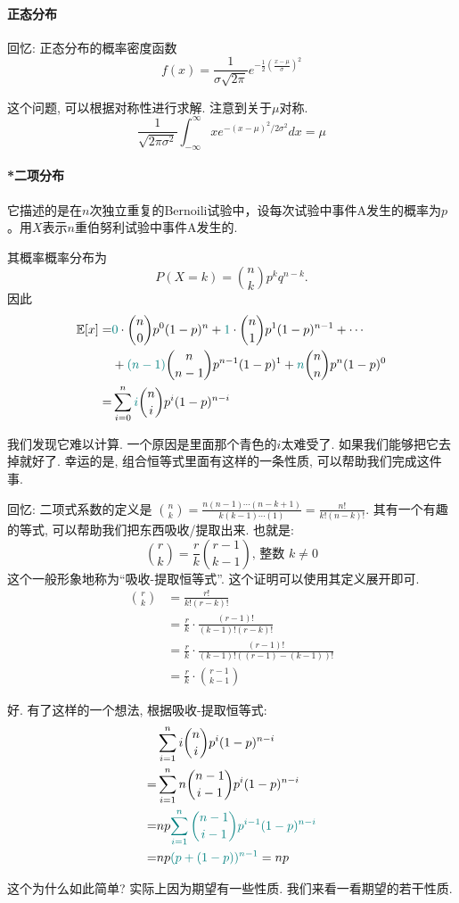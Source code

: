 \paragraph{正态分布}
回忆: 正态分布的概率密度函数$$
    f(x)=\frac{1}{\sigma \sqrt{2 \pi}} e^{-\frac{1}{2}\left(\frac{x-\mu}{\sigma}\right)^2}
    $$

    这个问题, 可以根据对称性进行求解. 注意到关于$\mu$对称.  
    $$
\frac{1}{\sqrt{2 \pi \sigma^2}} \int_{-\infty}^{\infty} x e^{-(x-\mu)^2 / 2 \sigma^2} d x=\mu
$$


    \begin{shaded}
        \paragraph{*二项分布} 它描述的是在$n$次独立重复的Bernoili试验中，设每次试验中事件A发生的概率为$p$。用$X$表示$n$重伯努利试验中事件A发生的{}.

        其概率概率分布为$$P(X=k)={n\choose k} p^k q^{n-k}.$$
        因此
    $$
\begin{aligned}
\mathbb E[x]= & {{\color{teal}0}} \cdot {n \choose 0} p^0(1-p)^n+{{\color{teal}1}} \cdot\binom n1 p^1(1-p)^{n-1}+\cdots \\
& +{{\color{teal}(n-1)}}\binom n{n-1} p^{n-1}(1-p)^1  +{{\color{teal}n}}\binom nn
 p^n(1-p)^0 \\
= & \sum_{i=0}^n {{\color{teal}i}}\binom ni p^i(1-p)^{n-i}
\end{aligned}
$$

我们发现它难以计算. 一个原因是里面那个青色的$i$太难受了. 如果我们能够把它去掉就好了. 幸运的是, 组合恒等式里面有这样的一条性质, 可以帮助我们完成这件事. 

回忆: 二项式系数的定义是 $\binom nk = \frac{n(n-1) \cdots(n-k+1)}{k(k-1) \cdots(1)}=\frac{n !}{k !(n-k) !}$. 其有一个有趣的等式, 可以帮助我们把东西吸收/提取出来. 也就是: 
$$
\binom rk=\frac{r}{k}\binom{r-1}{k-1} \text {, 整数 } k \neq 0
$$
这个一般形象地称为``吸收-提取恒等式''. 这个证明可以使用其定义展开即可. 
$$
\begin{aligned}
\binom rk & =\frac{r !}{k !(r-k) !} \\
& =\frac{r}{k} \cdot \frac{(r-1) !}{(k-1) !(r-k) !} \\
& =\frac{r}{k} \cdot \frac{(r-1) !}{(k-1) !((r-1)-(k-1)) !} \\
& =\frac{r}{k} \cdot \binom {r-1}{k-1}
\end{aligned}
$$


好. 有了这样的一个想法,  根据吸收-提取恒等式:
$$
\begin{aligned}
& \sum_{i=1}^n i\binom ni p^i(1-p)^{n-i} \\
= & \sum_{i=1}^n n\binom{n-1}{i-1} p^i(1-p)^{n-i} \\
= & n p {{\color{teal}\sum_{i=1}^n\binom{n-1}{i-1} p^{i-1}(1-p)^{n-i}}} \\
= & n p{{\color{teal}(p+(1-p))^{n-1}}}=n p
\end{aligned}
$$

这个为什么如此简单? 实际上因为期望有一些性质. 我们来看一看期望的若干性质. 
    \end{shaded}


